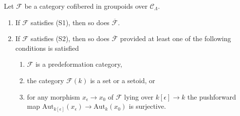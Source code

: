\begin{lemma}
\label{lemma-S1-S2-associated-functor}
Let $\mathcal{F}$ be a category cofibered in groupoids over
$\mathcal{C}_\Lambda$.
\begin{enumerate}
\item If $\mathcal{F}$ satisfies (S1), then so does
$\overline{\mathcal{F}}$.
\item If $\mathcal{F}$ satisfies (S2), then so does
$\overline{\mathcal{F}}$ provided at least one of the following conditions is
satisfied
\begin{enumerate}
\item $\mathcal{F}$ is a predeformation category,
\item the category $\mathcal{F}(k)$ is a set or a setoid, or
\item for any morphism $x_\epsilon \to x_0$ of $\mathcal{F}$
lying over $k[\epsilon] \to k$ the pushforward map
$\text{Aut}_{k[\epsilon]}(x_\epsilon) \to \text{Aut}_k(x_0)$
is surjective.
\end{enumerate}
\end{enumerate}
\end{lemma}

